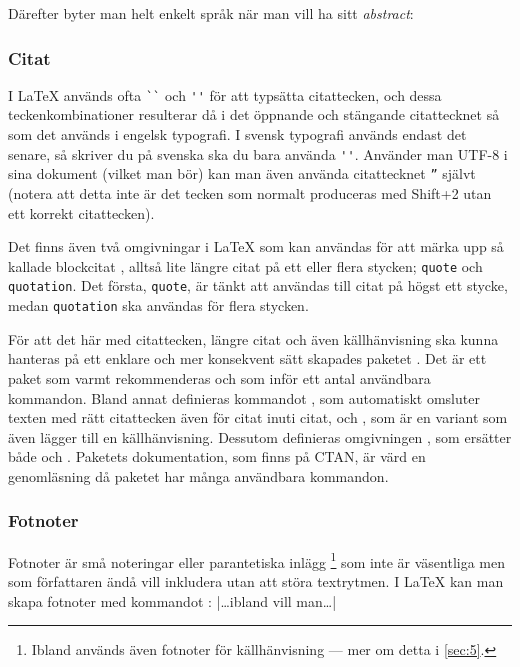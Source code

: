 \documentclass[lang=sv,ptsize=10pt,font=none,nomath,titles=bf,../../a4.tex]{subfiles}
\begin{document}
	Därefter byter man helt enkelt språk när man vill ha sitt \emph{abstract}:
\begin{latexcode}
\begin{otherlanguage}{english}
\begin{abstract}
\end{abstract}
\end{otherlanguage}
\begin{abstract}
\end{abstract}
\end{latexcode}

\subsubsection{Citat}
I \LaTeX{} används ofta \verb|``| och \verb|''| för att typsätta citattecken,
och dessa teckenkombinationer resulterar då i det öppnande och stängande
citattecknet så som det används i engelsk typografi. I svensk typografi
används endast det senare, så skriver du på svenska ska du bara använda
\verb|''|. Använder man UTF-8 i sina dokument (vilket man bör) kan man
även använda citattecknet \verb|”| självt (notera att detta inte är det
tecken som normalt produceras med Shift+2 utan ett korrekt citattecken).

Det finns även två omgivningar i \LaTeX{} som kan användas för att märka upp
så kallade blockcitat , alltså lite längre citat på ett
eller flera stycken; \texttt{quote} och \texttt{quotation}. Det första,
\texttt{quote}, är tänkt att användas till citat på högst ett stycke,
medan \texttt{quotation} ska användas för flera stycken.

För att det här med citattecken, längre citat och även källhänvisning ska
kunna hanteras på ett enklare och mer konsekvent sätt skapades paketet
. Det är ett paket som varmt rekommenderas och som inför
ett antal användbara kommandon. Bland annat definieras kommandot
, som automatiskt omsluter texten med rätt citattecken även
för citat inuti citat, och
, som är en variant som även lägger till en källhänvisning.
Dessutom definieras omgivningen , som ersätter både
 och . Paketets dokumentation, som finns på CTAN,
är värd en genomläsning då paketet har många användbara kommandon.

\subsubsection{Fotnoter}\label{sec:2:footnote}
Fotnoter är små noteringar eller parantetiska inlägg%
\footnote{Ibland används även fotnoter för källhänvisning — mer om detta
i \cref{sec:5}.} som inte är väsentliga men som författaren ändå
vill inkludera utan att störa textrytmen. I \LaTeX{} kan man skapa 
fotnoter med kommandot :
\latex|\ldots{}ibland vill man\ldots|
\end{document}
